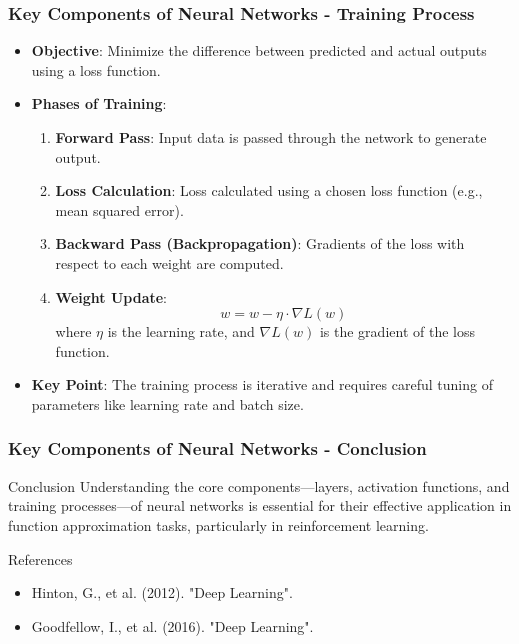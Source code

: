 \documentclass[aspectratio=169]{beamer}
\begin{document}
\begin{frame}[fragile]
    \frametitle{Key Components of Neural Networks - Training Process}
    \begin{itemize}
        \item \textbf{Objective}: Minimize the difference between predicted and actual outputs using a loss function.
        \item \textbf{Phases of Training}:
        \begin{enumerate}
            \item \textbf{Forward Pass}: Input data is passed through the network to generate output.
            \item \textbf{Loss Calculation}: Loss calculated using a chosen loss function (e.g., mean squared error).
            \item \textbf{Backward Pass (Backpropagation)}: Gradients of the loss with respect to each weight are computed.
            \item \textbf{Weight Update}:
                \begin{equation}
                    w = w - \eta \cdot \nabla L(w)
                \end{equation}
                where \( \eta \) is the learning rate, and \( \nabla L(w) \) is the gradient of the loss function.
        \end{enumerate}
        \item \textbf{Key Point}: The training process is iterative and requires careful tuning of parameters like learning rate and batch size.
    \end{itemize}
\end{frame}

\begin{frame}[fragile]
    \frametitle{Key Components of Neural Networks - Conclusion}
    \begin{block}{Conclusion}
        Understanding the core components—layers, activation functions, and training processes—of neural networks is essential for their effective application in function approximation tasks, particularly in reinforcement learning.
    \end{block}

    \begin{block}{References}
        \begin{itemize}
            \item Hinton, G., et al. (2012). "Deep Learning".
            \item Goodfellow, I., et al. (2016). "Deep Learning".
        \end{itemize}
    \end{block}
\end{frame}
\end{document}
